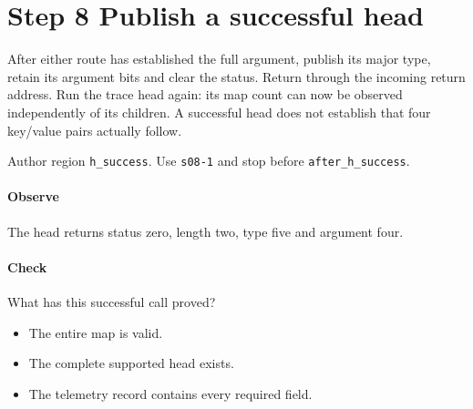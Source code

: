 \section{Step 8 Publish a successful head}\label{cbor-s08}
After either route has established the full argument, publish its major type, retain its argument bits and clear the status. Return through the incoming return address. Run the trace head again: its map count can now be observed independently of its children. A successful head does not establish that four key/value pairs actually follow.

Author region \texttt{h\_success}. Use \texttt{s08-1} and stop before \texttt{after\_h\_success}. 

\paragraph{Observe} The head returns status zero, length two, type five and argument four.

\paragraph{Check} What has this successful call proved?
\begin{itemize}
\item[A.] The entire map is valid.
\item[B.] The complete supported head exists.
\item[C.] The telemetry record contains every required field.
\end{itemize}
